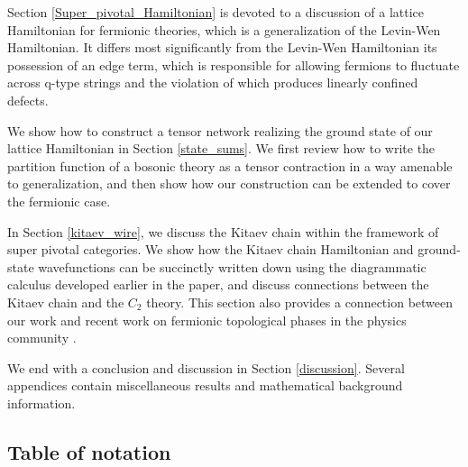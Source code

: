 Section \ref{Super_pivotal_Hamiltonian} is devoted to a discussion of a lattice Hamiltonian for fermionic theories, which is a generalization of the Levin-Wen Hamiltonian. 
It differs most significantly from the Levin-Wen Hamiltonian its possession of an edge term, which 
is responsible for allowing fermions to fluctuate across q-type strings and the violation 
of which produces linearly confined defects. 

We show how to construct a tensor network realizing the ground state of our lattice Hamiltonian 
in Section \ref{state_sums}. We first review how to write the partition function of a bosonic theory 
as a tensor contraction in a way amenable to generalization, and then show how our construction 
can be extended to cover the fermionic case. 

In Section \ref{kitaev_wire}, we discuss the Kitaev chain within the framework of super pivotal 
categories. 
We show how the Kitaev chain Hamiltonian and ground-state wavefunctions can be 
succinctly written down using the diagrammatic calculus developed earlier in the paper, and 
discuss connections between the Kitaev chain and the $C_2$ theory. 
This section also provides a connection between our work 
and recent work on fermionic topological phases in the physics community \cite{ware2016,tarantino2016,turzillo2016}. 

We end with a conclusion and discussion in Section \ref{discussion}. 
Several appendices contain miscellaneous results and mathematical background information. 


%








\subsection{Table of notation}

